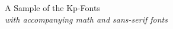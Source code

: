 \documentclass[11pt]{article}
\begin{document}
{\LARGE \noindent A Sample of the Kp-Fonts}\\

{\large \noindent \textit{with accompanying math and sans-serif fonts}}\\[5pt]


\end{document}
